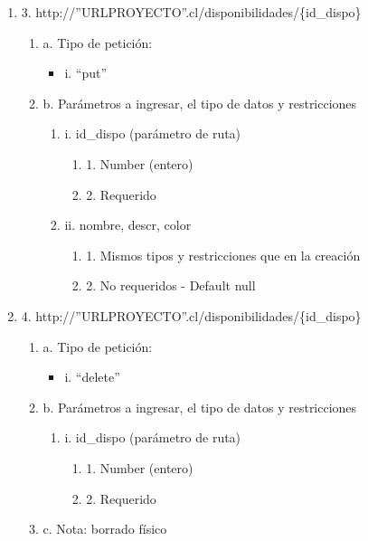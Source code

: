\begin{enumerate}
    \item 3. http://”URLPROYECTO”.cl/disponibilidades/\{id\_dispo\}
    \begin{enumerate}
        \item a. Tipo de petición:
            \begin{itemize}
               \item i. “put”
            \end{itemize}
        \item b. Parámetros a ingresar, el tipo de datos y restricciones
            \begin{enumerate}
                \item i. id\_dispo (parámetro de ruta)
                    \begin{enumerate}
                        \item 1. Number (entero)
                        \item 2. Requerido
                    \end{enumerate}
                \item ii. nombre, descr, color
                    \begin{enumerate}
                        \item 1. Mismos tipos y restricciones que en la creación
                        \item 2. No requeridos - Default null
                    \end{enumerate}
            \end{enumerate}
    \end{enumerate}

    \item 4. http://”URLPROYECTO”.cl/disponibilidades/\{id\_dispo\}
    \begin{enumerate}
        \item a. Tipo de petición:
            \begin{itemize}
               \item i. “delete”
            \end{itemize}
        \item b. Parámetros a ingresar, el tipo de datos y restricciones
            \begin{enumerate}
                \item i. id\_dispo (parámetro de ruta)
                    \begin{enumerate}
                        \item 1. Number (entero)
                        \item 2. Requerido
                    \end{enumerate}
            \end{enumerate}
        \item c. Nota: borrado físico
    \end{enumerate}


\end{enumerate}
